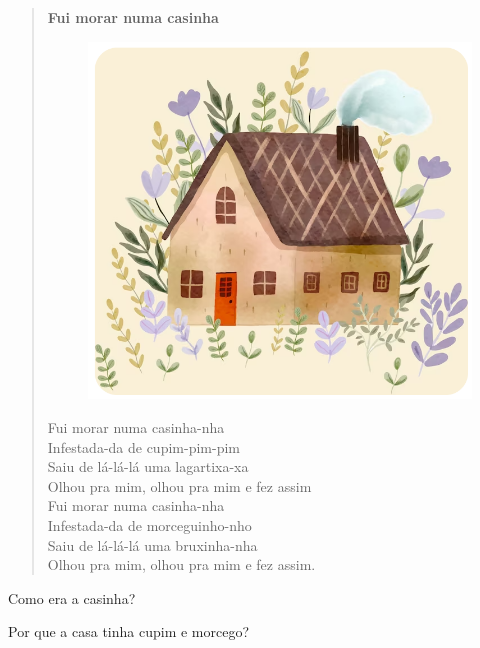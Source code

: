 \begin{myquote}
\begin{verse}
\textbf{Fui morar numa casinha}
\begin{figure}[H]
\centering
\includegraphics[width=.6\textwidth]{media/image198.png}
\end{figure}
Fui morar numa casinha-nha\\
Infestada-da de cupim-pim-pim\\
Saiu de lá-lá-lá uma lagartixa-xa\\
Olhou pra mim, olhou pra mim e fez assim\\
Fui morar numa casinha-nha\\
Infestada-da de morceguinho-nho\\
Saiu de lá-lá-lá uma bruxinha-nha\\
Olhou pra mim, olhou pra mim e fez assim.
\end{verse}

\end{myquote}

\begin{escolha}
\item Como era a casinha?


\item Por que a casa tinha cupim e morcego?

\end{escolha}

